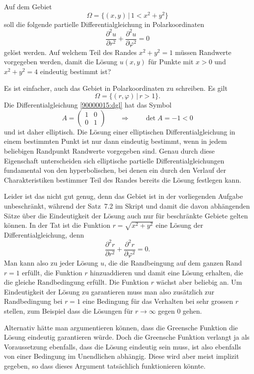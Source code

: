 Auf dem Gebiet
\[
\Omega = \{ (x,y)\,|\, 1 < x^2 + y^2\}
\]
soll die folgende partielle Differentialgleichung in Polarkoordinaten
\begin{equation}
\frac{\partial^2 u}{\partial r^2}
+
\frac{\partial^2 u}{\partial \varphi^2}
=
0
\label{90000015:dgl}
\end{equation}
gelöst werden.
Auf welchem Teil des Randes $x^2 +y^2 = 1$ müssen Randwerte vorgegeben
werden, damit die Lösung $u(x,y)$ für Punkte mit $x>0$ und $x^2 + y^2 = 4$
eindeutig bestimmt ist?

\begin{loesung}
Es ist einfacher, auch das Gebiet in Polarkoordinaten zu schreiben.
Es gilt
\[
\Omega = \{ (r,\varphi)\,|\, r>1\}.
\]
Die Differentialgleichung \eqref{90000015:dgl} hat das Symbol
\[
A
=
\begin{pmatrix}
1&0\\
0&1
\end{pmatrix}
\qquad\Rightarrow\qquad
\det A=-1<0
\]
und ist daher elliptisch.
Die Lösung einer elliptischen Differentialgleichung in einem bestimmten
Punkt ist nur dann eindeutig bestimmt, wenn in jedem beliebigen Randpunkt
Randwerte vorgegeben sind.
Genau durch diese Eigenschaft unterscheiden sich elliptische
partielle Differentialgleichungen fundamental von den
hyperbolischen, bei denen ein durch
den Verlauf der Charakteristiken bestimmer Teil des Randes bereits die
Lösung festlegen kann.

Leider ist das nicht gut genug, denn das Gebiet ist in der vorliegenden
Aufgabe unbeschränkt, während der Satz~7.2 im Skript und damit die davon
abhängenden Sätze über die Eindeutigkeit der Lösung auch nur für beschränkte
Gebiete gelten können.
In der Tat ist die Funktion  $r=\sqrt{x^2+y^2}$ eine Lösung der
Differentialgleichung, denn
\[
\frac{\partial^2 r}{\partial r^2} + \frac{\partial^2 r}{\partial \varphi^2}=0.
\]
Man kann also zu jeder Lösung $u$, die die Randbeingung auf dem ganzen Rand
$r=1$ erfüllt, die Funktion $r$ hinzuaddieren und damit eine Lösung erhalten,
die die gleiche Randbedingung erfüllt.
Die Funktion $r$ wächst aber beliebig an.
Um Eindeutigkeit der Lösung zu garantieren muss man also zusätzlich zur
Randbedingung bei $r=1$ eine Bedingung für das Verhalten bei sehr grossen $r$
stellen, zum Beispiel dass die Lösungen für $r\to\infty$ gegen $0$ gehen.

Alternativ hätte man argumentieren können, dass die Greensche Funktion 
die Lösung eindeutig garantieren würde.
Doch die Greensche Funktion verlangt ja als Voraussetzung ebenfalls,
dass die Lösung eindeutig sein muss, ist also ebenfalls von einer
Bedingung im Unendlichen abhängig.
Diese wird aber meist implizit gegeben, so dass dieses Argument
tatsächlich funktionieren könnte.


\end{loesung}
